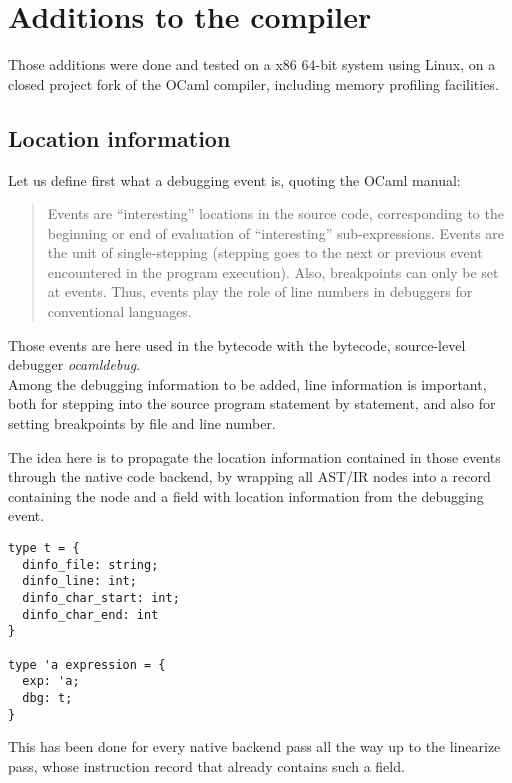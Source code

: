 \section{Additions to the compiler}

Those additions were done and tested on a x86 64-bit system using Linux, on a
closed project fork of the OCaml compiler, including memory profiling
facilities.

\subsection{Location information}

Let us define first what a debugging event is, quoting the OCaml manual:

\begin{quotation}
    Events are “interesting” locations in the source code, corresponding to the
    beginning or end of evaluation of “interesting” sub-expressions. Events are
    the unit of single-stepping (stepping goes to the next or previous event
    encountered in the program execution). Also, breakpoints can only be set at
    events. Thus, events play the role of line numbers in debuggers for
    conventional languages. \autocite{events}
\end{quotation}

Those events are here used in the bytecode with the bytecode, source-level
debugger \textit{ocamldebug}. \\

Among the debugging information to be added, line information is important,
both for stepping into the source program statement by statement,
and also for setting breakpoints by file and line number.

The idea here is to propagate the location information contained in those events
through the native code backend, by wrapping all AST/IR nodes into a record
containing the node and a field with location information from the debugging
event.

\begin{lstlisting}
type t = {
  dinfo_file: string;
  dinfo_line: int;
  dinfo_char_start: int;
  dinfo_char_end: int
}

type 'a expression = {
  exp: 'a;
  dbg: t;
}
\end{lstlisting}

This has been done for every native backend pass all the way up to the linearize
pass, whose instruction record that already contains such a field.

